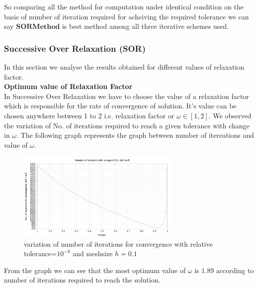 So comparing all the method for computation under identical condition on the basis of number of iteration required for acheiving the required tolerance we can say $ \boldsymbol{SOR Method} $ is best method among all three iterative schemes used.

\subsubsection{Successive Over Relaxation (SOR)}
In this section we analyse the results obtained for different values of relaxation factor. \\[2mm]
\noindent
\textbf{ Optimum value of Relaxation Factor } \\
In Successive Over Relaxation we have to choose the value of a relaxation factor which is responsible for the rate of convergence of solution. It's value can be chosen anywhere between 1 to 2 i.e. relaxation factor or $\omega  \in [1,2]$. We observed the variation of No. of iterations required to reach a given tolerance with change in $ \omega $. The following graph represents the graph between number of itereations and value of $\omega$. \\
\begin{figure}[H]
    \centering
    \includegraphics[width=0.7\textwidth]{content/graphs/omega.png}
    \caption{variation of number of iterations for convergence with relative tolerance=$10^{-8}$ and meshsize $h = 0.1$  }
    \label{omega variation}
\end{figure}
From the graph we can see that the most optimum value of $ \omega $ is $1.89$ according to number of iterations required to reach the solution.

